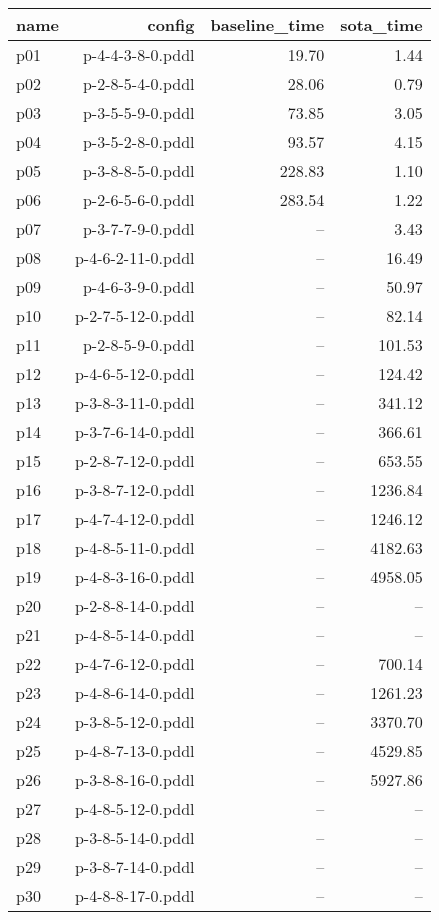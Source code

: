 \documentclass{article}
\begin{document}
                            \begin{center}
                            \scriptsize
                            \begin{tabular}{@{}l|r|r|r@{}}
                            name & config & baseline\_time & sota\_time\\\midrule
                              p01& p-4-4-3-8-0.pddl&19.70&1.44\\
  p02& p-2-8-5-4-0.pddl&28.06&0.79\\
  p03& p-3-5-5-9-0.pddl&73.85&3.05\\
  p04& p-3-5-2-8-0.pddl&93.57&4.15\\
  p05& p-3-8-8-5-0.pddl&228.83&1.10\\
  p06& p-2-6-5-6-0.pddl&283.54&1.22\\
  p07& p-3-7-7-9-0.pddl&--&3.43\\
  p08& p-4-6-2-11-0.pddl&--&16.49\\
  p09& p-4-6-3-9-0.pddl&--&50.97\\
  p10& p-2-7-5-12-0.pddl&--&82.14\\
  p11& p-2-8-5-9-0.pddl&--&101.53\\
  p12& p-4-6-5-12-0.pddl&--&124.42\\
  p13& p-3-8-3-11-0.pddl&--&341.12\\
  p14& p-3-7-6-14-0.pddl&--&366.61\\
  p15& p-2-8-7-12-0.pddl&--&653.55\\
  p16& p-3-8-7-12-0.pddl&--&1236.84\\
  p17& p-4-7-4-12-0.pddl&--&1246.12\\
  p18& p-4-8-5-11-0.pddl&--&4182.63\\
  p19& p-4-8-3-16-0.pddl&--&4958.05\\
  p20& p-2-8-8-14-0.pddl&--&--\\
  p21& p-4-8-5-14-0.pddl&--&--\\
  p22& p-4-7-6-12-0.pddl&--&700.14\\
  p23& p-4-8-6-14-0.pddl&--&1261.23\\
  p24& p-3-8-5-12-0.pddl&--&3370.70\\
  p25& p-4-8-7-13-0.pddl&--&4529.85\\
  p26& p-3-8-8-16-0.pddl&--&5927.86\\
  p27& p-4-8-5-12-0.pddl&--&--\\
  p28& p-3-8-5-14-0.pddl&--&--\\
  p29& p-3-8-7-14-0.pddl&--&--\\
  p30& p-4-8-8-17-0.pddl&--&--
                            \end{tabular}
                            \end{center}
                    
\end{document}
